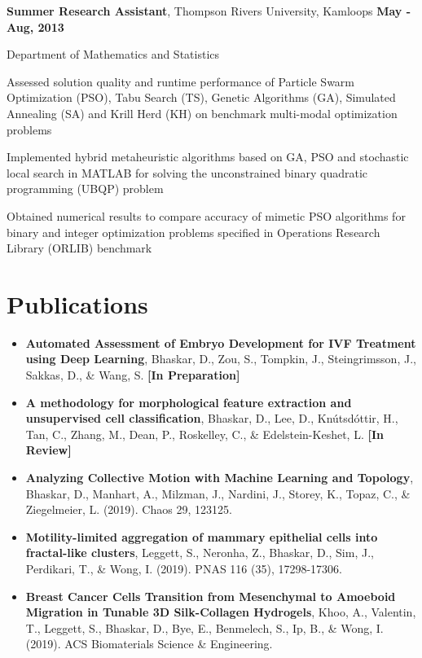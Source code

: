 \documentclass[margin,line]{res}
\newenvironment{list1}{
  \begin{list}{\ding{113}}{
      \setlength{\itemsep}{0in}
      \setlength{\parsep}{0in} \setlength{\parskip}{0in}
      \setlength{\topsep}{0in} \setlength{\partopsep}{0in}
      \setlength{\leftmargin}{0.17in}}}{\end{list}}
\newenvironment{list3}{
  \begin{list}{\textopenbullet}{
      \setlength{\itemsep}{0in}
      \setlength{\parsep}{0in} \setlength{\parskip}{0in}
      \setlength{\topsep}{0in} \setlength{\partopsep}{0in}
      \setlength{\leftmargin}{0.1in}}}{\end{list}}
\begin{document}
\begin{resume}
{\bf Summer Research Assistant}, Thompson Rivers University, Kamloops \hfill {\bf May - Aug, 2013}\\
\vspace*{-.2cm}
\begin{list1}
\item[] Department of Mathematics and Statistics
\vspace*{.2cm}
\begin{list3}
\setlength\itemsep{0.5em}
\item Assessed solution quality and runtime performance of Particle Swarm Optimization (PSO), Tabu Search (TS), Genetic Algorithms (GA), Simulated Annealing (SA) and Krill Herd (KH) on benchmark multi-modal optimization problems
\item Implemented hybrid metaheuristic algorithms based on GA, PSO and stochastic local search in MATLAB for solving the unconstrained binary quadratic programming (UBQP) problem
\item Obtained numerical results to compare accuracy of mimetic PSO algorithms for binary and integer optimization problems specified in Operations Research Library (ORLIB) benchmark
\end{list3}
\end{list1}

\vspace*{.3cm}

\section{\sc Publications}

{\renewcommand\leftmargini{0em}
\begin{itemize}
\item{\bf Automated Assessment of Embryo Development for IVF Treatment using Deep Learning}, Bhaskar, D., Zou, S., Tompkin, J., Steingrimsson, J., Sakkas, D., \& Wang, S. {\bf[In Preparation]}
\item{\bf A methodology for morphological feature extraction and unsupervised cell classification}, Bhaskar, D., Lee, D., Kn\'{u}tsd\'{o}ttir, H., Tan, C., Zhang, M., Dean, P., Roskelley, C., \& Edelstein-Keshet, L. {\bf[In Review]}
\vspace*{.1cm}
\item{\bf Analyzing Collective Motion with Machine Learning and Topology}, Bhaskar, D., Manhart, A., Milzman, J., Nardini, J., Storey, K., Topaz, C., \& Ziegelmeier, L. (2019). Chaos 29, 123125.
\vspace*{.1cm}
\item{\bf Motility-limited aggregation of mammary epithelial cells into fractal-like clusters}, Leggett, S., Neronha, Z., Bhaskar, D., Sim, J., Perdikari, T., \& Wong, I. (2019). PNAS 116 (35), 17298-17306.
\item{\bf Breast Cancer Cells Transition from Mesenchymal to Amoeboid Migration in Tunable 3D Silk-Collagen Hydrogels}, Khoo, A., Valentin, T., Leggett, S., Bhaskar, D., Bye, E., Benmelech, S., Ip, B., \& Wong, I. (2019). ACS Biomaterials Science \& Engineering.
\end{itemize}
}


\end{resume}
\end{document}
